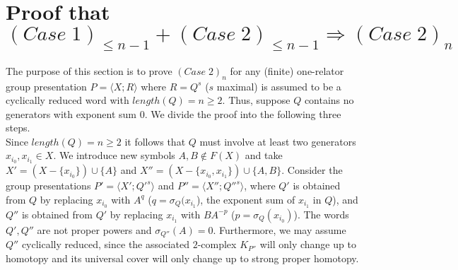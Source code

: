 \documentclass{amsart}[12pt]
\theoremstyle{definition}
\theoremstyle{remark}
\numberwithin{equation}{section}
\begin{document}
\section{Proof that $(Case \; 1)_{\leq n-1} + (Case \; 2)_{\leq n-1} \Rightarrow (Case \; 2)_n$}
The purpose of this section is to prove $(Case \; 2)_n$ for any
(finite) one-relator group presentation $P= \langle X;R \rangle$
where $R=Q^s$ ($s$ maximal) is assumed to be a cyclically reduced
word with $length(Q)=n \geq 2$. Thus, suppose $Q$ contains no
generators
with exponent sum $0$. We divide the proof into the following three steps.\\

 Since $length(Q) =n \geq 2$ it
follows that $Q$ must involve at least two generators $x_{i_0},
x_{i_1} \in X$. We introduce new symbols $A, B \notin F(X)$ and
take $X'= (X - \{x_{i_0} \}) \cup \{A\}$ and $X''= (X - \{x_{i_0},
x_{i_1} \}) \cup \{A, B\}$. Consider the group presentations $P' =
\langle X'; {Q'}^s \rangle$ and $P'' = \langle X''; {Q''}^s
\rangle$, where $Q'$ is obtained from $Q$ by replacing $x_{i_0}$
with $A^q$ ($q=\sigma_Q(x_{i_1}$), the exponent sum of $x_{i_1}$
in $Q$), and $Q''$ is obtained from $Q'$ by repla\-cing $x_{i_1}$
with $BA^{-p}$ ($p= \sigma_Q(x_{i_0})$). The words $Q', Q''$ are
not proper powers and $\sigma_{Q''}(A)=0$. Furthermore, we may
assume $Q''$ cyclically reduced, since the associated $2$-complex
$K_{P''}$ will only change up to homotopy and its universal cover
will only change up to strong proper
homotopy.\\
\end{document}
